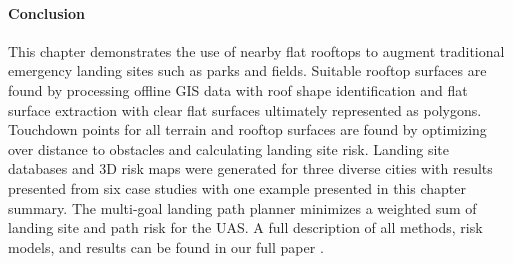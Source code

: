 \paragraph{Conclusion}
This chapter demonstrates the use of nearby flat rooftops to augment traditional emergency landing sites such as parks and fields. Suitable rooftop surfaces are found by processing offline GIS data with roof shape identification and flat surface extraction with clear flat surfaces ultimately represented as polygons. Touchdown points for all terrain and rooftop surfaces are found by optimizing over distance to obstacles and calculating landing site risk. Landing site databases and 3D risk maps were generated for three diverse cities with results presented from six case studies with one example presented in this chapter summary. The multi-goal landing path planner minimizes a weighted sum of landing site and path risk for the UAS. A full description of all methods, risk models, and results can be found in our full paper \cite{castagno_map-based_2021}.